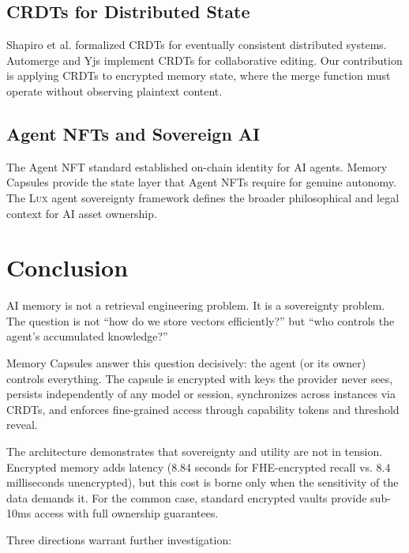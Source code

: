 \documentclass[11pt,letterpaper]{article}
\theoremstyle{definition}
\theoremstyle{remark}
\newcommand{\Lux}{\textsc{Lux}}
\begin{document}
\subsection{CRDTs for Distributed State}

Shapiro et al. \cite{shapiro2011crdt} formalized CRDTs for eventually consistent distributed systems. Automerge and Yjs implement CRDTs for collaborative editing. Our contribution is applying CRDTs to encrypted memory state, where the merge function must operate without observing plaintext content.

\subsection{Agent NFTs and Sovereign AI}

The Agent NFT standard \cite{zoo-agent-nft} established on-chain identity for AI agents. Memory Capsules provide the state layer that Agent NFTs require for genuine autonomy. The \Lux{} agent sovereignty framework \cite{lux-agent-sovereignty} defines the broader philosophical and legal context for AI asset ownership.

\section{Conclusion}
\label{sec:conclusion}

AI memory is not a retrieval engineering problem. It is a sovereignty problem. The question is not ``how do we store vectors efficiently?'' but ``who controls the agent's accumulated knowledge?''

Memory Capsules answer this question decisively: the agent (or its owner) controls everything. The capsule is encrypted with keys the provider never sees, persists independently of any model or session, synchronizes across instances via CRDTs, and enforces fine-grained access through capability tokens and threshold reveal.

The architecture demonstrates that sovereignty and utility are not in tension. Encrypted memory adds latency (8.84 seconds for FHE-encrypted recall vs. 8.4 milliseconds unencrypted), but this cost is borne only when the sensitivity of the data demands it. For the common case, standard encrypted vaults provide sub-10ms access with full ownership guarantees.

Three directions warrant further investigation:
\end{document}
